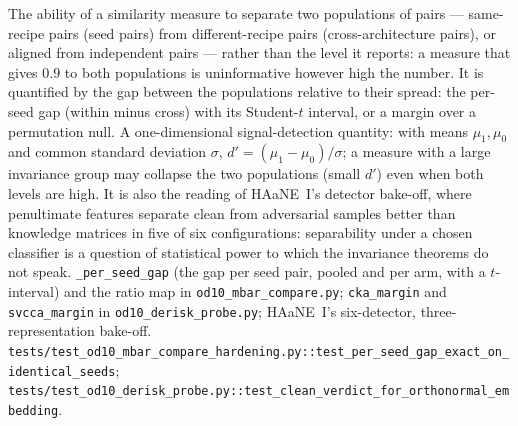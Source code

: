 {The ability of a similarity measure to separate two populations of pairs --- same-recipe pairs (seed pairs) from different-recipe pairs (cross-architecture pairs), or aligned from independent pairs --- rather than the level it reports: a measure that gives $0.9$ to both populations is uninformative however high the number. It is quantified by the gap between the populations relative to their spread: the per-seed gap (within minus cross) with its Student-$t$ interval, or a margin over a permutation null.}
{A one-dimensional signal-detection quantity: with means $\mu_1,\mu_0$ and common standard deviation $\sigma$, $d'=(\mu_1-\mu_0)/\sigma$; a measure with a large invariance group may collapse the two populations (small $d'$) even when both levels are high. It is also the reading of HAaNE~I's detector bake-off, where penultimate features separate clean from adversarial samples better than knowledge matrices in five of six configurations: separability under a chosen classifier is a question of statistical power to which the invariance theorems do not speak.}
{\texttt{\_per\_seed\_gap} (the gap per seed pair, pooled and per arm, with a $t$-interval) and the ratio map in \texttt{od10\_mbar\_compare.py}; \texttt{cka\_margin} and \texttt{svcca\_margin} in \texttt{od10\_derisk\_probe.py}; HAaNE~I's six-detector, three-representation bake-off.}
{\texttt{tests/test\_od10\_mbar\_compare\_hardening.py::test\_per\_seed\_gap\_exact\_on\_identical\_seeds}; \texttt{tests/test\_od10\_derisk\_probe.py::test\_clean\_verdict\_for\_orthonormal\_embedding}.}
